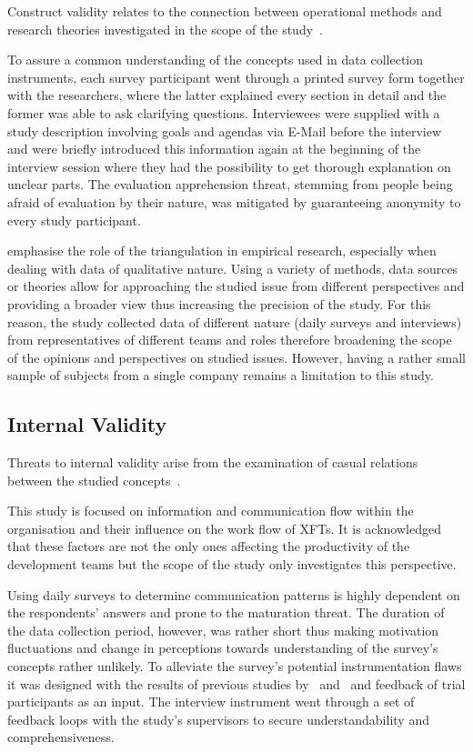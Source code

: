 Construct validity relates to the connection between operational methods and research theories investigated in the scope of the study~\citep{runeson}.

To assure a common understanding of the concepts used in data collection instruments, each survey participant went through a printed survey form together with the researchers, where the latter explained every section in detail and the former was able to ask clarifying questions. Interviewees were supplied with a study description involving goals and agendas via E-Mail before the interview and were briefly introduced this information again at the beginning of the interview session where they had the possibility to get thorough explanation on unclear parts. The evaluation apprehension threat, stemming from people being afraid of evaluation by their nature, was mitigated by guaranteeing anonymity to every study participant.

\citet{runeson} emphasise the role of the triangulation in empirical research, especially when dealing with data of qualitative nature. Using a variety of methods, data sources or theories allow for approaching the studied issue from different perspectives and providing a broader view thus increasing the precision of the study.
For this reason, the study collected data of different nature (daily surveys and interviews) from representatives of different teams and roles therefore broadening the scope of the opinions and perspectives on studied issues.
However, having a rather small sample of subjects from a single company remains a limitation to this study.

\subsection{Internal Validity}

Threats to internal validity arise from the examination of casual relations between the studied concepts~\citep{runeson}.

This study is focused on information and communication flow within the organisation and their influence on the work flow of \acp{XFT}. It is acknowledged that these factors are not the only ones affecting the productivity of the development teams but the scope of the study only investigates this perspective.

Using daily surveys to determine communication patterns is highly dependent on the respondents' answers and prone to the maturation threat. The duration of the data collection period, however, was rather short thus making motivation fluctuations and change in perceptions towards understanding of the survey's concepts rather unlikely.
To alleviate the survey's potential instrumentation flaws it was designed with the results of previous studies by~\citet{nelson2013technicaldependencies} and~\citet{boerjesson2013} and feedback of trial participants as an input. The interview instrument went through a set of feedback loops with the study's supervisors to secure understandability and comprehensiveness.

